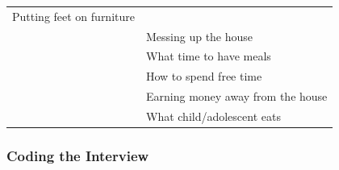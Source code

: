 \documentclass[]{book}
\begin{document}
\begin{longtable}[]{@{}ll@{}}
\begin{minipage}[t]{0.44\columnwidth}
Putting feet on furniture\strut
\end{minipage}\tabularnewline
\begin{minipage}[t]{0.50\columnwidth}\raggedright
\strut
\end{minipage} & \begin{minipage}[t]{0.44\columnwidth}\raggedright
Messing up the house\strut
\end{minipage}\tabularnewline
\begin{minipage}[t]{0.50\columnwidth}\raggedright
\strut
\end{minipage} & \begin{minipage}[t]{0.44\columnwidth}\raggedright
What time to have meals\strut
\end{minipage}\tabularnewline
\begin{minipage}[t]{0.50\columnwidth}\raggedright
\strut
\end{minipage} & \begin{minipage}[t]{0.44\columnwidth}\raggedright
How to spend free time\strut
\end{minipage}\tabularnewline
\begin{minipage}[t]{0.50\columnwidth}\raggedright
\strut
\end{minipage} & \begin{minipage}[t]{0.44\columnwidth}\raggedright
Earning money away from the house\strut
\end{minipage}\tabularnewline
\begin{minipage}[t]{0.50\columnwidth}\raggedright
\strut
\end{minipage} & \begin{minipage}[t]{0.44\columnwidth}\raggedright
What child/adolescent eats\strut
\end{minipage}\tabularnewline
\bottomrule
\end{longtable}

\hypertarget{coding-the-interview}{%
\subsubsection{Coding the Interview}\label{coding-the-interview}}
\end{document}
